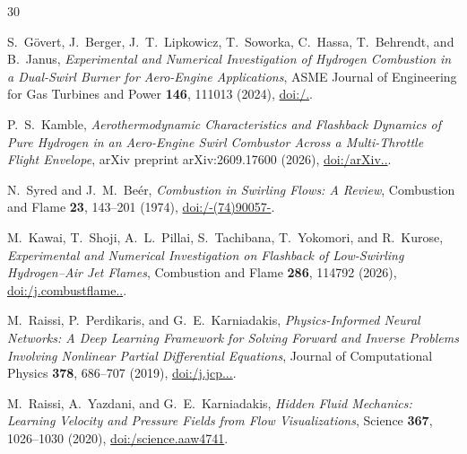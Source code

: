 \documentclass[reprint,aps,prfluids,superscriptaddress,twocolumn,floatfix]{revtex4-2}
\begin{document}
\begingroup
\sloppy
\fontsize{9.0pt}{11.4pt}\selectfont
\begin{thebibliography}{30}
\fontsize{7.6pt}{9.2pt}\selectfont
\setlength{\itemsep}{1.2pt plus 0.3pt minus 0.2pt}
\setlength{\parskip}{0pt}

 S.~G{\"o}vert, J.~Berger, J.~T.~Lipkowicz, T.~Soworka, C.~Hassa, T.~Behrendt, and B.~Janus, \textit{Experimental and Numerical Investigation of Hydrogen Combustion in a Dual-Swirl Burner for Aero-Engine Applications}, ASME Journal of Engineering for Gas Turbines and Power \textbf{146}, 111013 (2024), \href{https://doi.org/10.1115/1.4065925}{doi:/.}.

 P.~S.~Kamble, \textit{Aerothermodynamic Characteristics and Flashback Dynamics of Pure Hydrogen in an Aero-Engine Swirl Combustor Across a Multi-Throttle Flight Envelope}, arXiv preprint arXiv:2609.17600 (2026), \href{https://doi.org/10.48550/arXiv.2609.17600}{doi:/\allowbreak arXiv..}.

 N.~Syred and J.~M.~Be{\'e}r, \textit{Combustion in Swirling Flows: A Review}, Combustion and Flame \textbf{23}, 143--201 (1974), \href{https://doi.org/10.1016/0010-2180(74)90057-1}{doi:/-(74)90057-}.

 M.~Kawai, T.~Shoji, A.~L.~Pillai, S.~Tachibana, T.~Yokomori, and R.~Kurose, \textit{Experimental and Numerical Investigation on Flashback of Low-Swirling Hydrogen--Air Jet Flames}, Combustion and Flame \textbf{286}, 114792 (2026), \href{https://doi.org/10.1016/j.combustflame.2026.114792}{doi:/\allowbreak j.\allowbreak combustflame..}.

 M.~Raissi, P.~Perdikaris, and G.~E.~Karniadakis, \textit{Physics-Informed Neural Networks: A Deep Learning Framework for Solving Forward and Inverse Problems Involving Nonlinear Partial Differential Equations}, Journal of Computational Physics \textbf{378}, 686--707 (2019), \href{https://doi.org/10.1016/j.jcp.2018.10.045}{doi:/\allowbreak j.\allowbreak jcp...}.

 M.~Raissi, A.~Yazdani, and G.~E.~Karniadakis, \textit{Hidden Fluid Mechanics: Learning Velocity and Pressure Fields from Flow Visualizations}, Science \textbf{367}, 1026--1030 (2020), \href{https://doi.org/10.1126/science.aaw4741}{doi:/\allowbreak science.\allowbreak aaw4741}.


\end{thebibliography}
\end{document}

